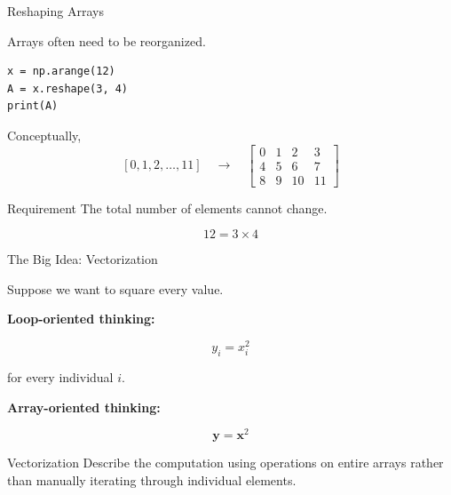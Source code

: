 \documentclass[11pt,aspectratio=43]{beamer}
\begin{document}
\begin{frame}[fragile]{Reshaping Arrays}

Arrays often need to be reorganized.

\begin{lstlisting}
x = np.arange(12)
A = x.reshape(3, 4)
print(A)
\end{lstlisting}

Conceptually,
\[
[0,1,2,\ldots,11]
\quad\longrightarrow\quad
\begin{bmatrix}
0&1&2&3\\
4&5&6&7\\
8&9&10&11
\end{bmatrix}
\]

\begin{block}{Requirement}
The total number of elements cannot change.
\end{block}

\[
12 = 3 \times 4
\]

\end{frame}

\begin{frame}{The Big Idea: Vectorization}

Suppose we want to square every value.

\textbf{Loop-oriented thinking:}

\[
y_i = x_i^2
\]

for every individual $i$.

\vspace{0.5cm}

\textbf{Array-oriented thinking:}

\[
\mathbf{y} = \mathbf{x}^2
\]

\begin{block}{Vectorization}
Describe the computation using operations on entire arrays rather
than manually iterating through individual elements.
\end{block}

\end{frame}
\end{document}
